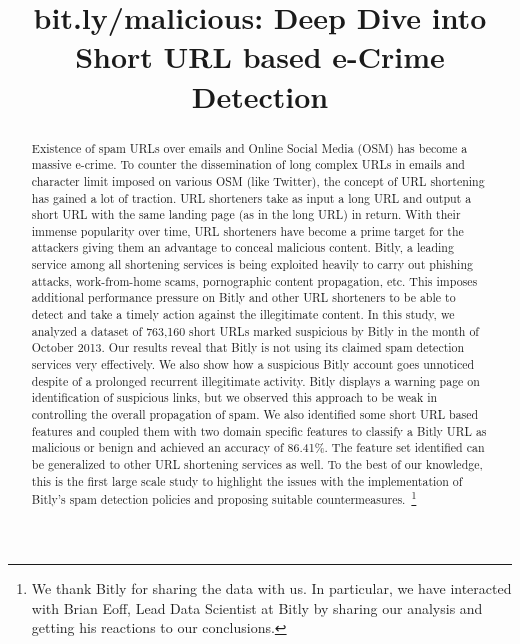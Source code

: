 \documentclass[conference]{IEEEtran}
\begin{document}
\title{bit.ly/malicious: Deep Dive into Short URL based e-Crime Detection}


\author{
}









\maketitle
\thispagestyle{empty}
\pagestyle{empty}
\begin{abstract}
Existence of spam URLs over emails and Online Social Media (OSM) has become a massive e-crime. To counter the dissemination of long complex URLs in emails and character limit imposed on various OSM (like Twitter), the concept of URL shortening has gained a lot of traction. URL shorteners take as input a long URL and output a short URL with the same landing page (as in the long URL) in return. With their immense popularity over time, URL shorteners have become a prime target for the attackers giving them an advantage to conceal malicious content. Bitly, a leading service among all shortening services is being exploited heavily to carry out phishing attacks, work-from-home scams, pornographic content propagation, etc. This imposes additional performance pressure on Bitly and other URL shorteners to be able to detect and take a timely action against the illegitimate content. In this study, we analyzed a dataset of 763,160 short URLs marked suspicious by Bitly in the month of October 2013. Our results reveal that Bitly is not using its claimed spam detection services very effectively.
We also show how a suspicious Bitly account goes unnoticed despite of a prolonged recurrent illegitimate activity. Bitly displays a warning page on identification of suspicious links, but we observed this approach to be weak in controlling the overall propagation of spam. We also identified some short URL based features and coupled them with two domain specific features to classify a Bitly URL as malicious or benign and achieved an accuracy of 86.41\%. The feature set identified can be generalized to other URL shortening services as well. To the best of our knowledge, this is the first large scale study to highlight the issues with the implementation of Bitly's spam detection policies and proposing suitable countermeasures.~\footnote{We thank Bitly for sharing the data with us. In particular, we have interacted with Brian Eoff, Lead Data Scientist at Bitly by sharing our analysis and getting his reactions to our conclusions.}
\end{abstract}
\end{document}
